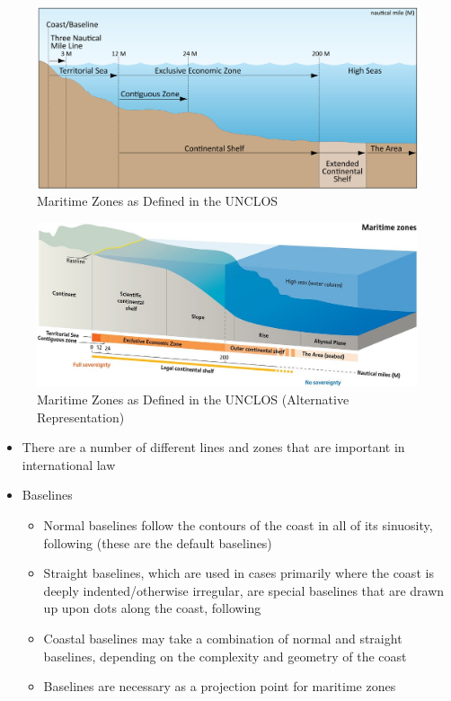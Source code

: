 \begin{figure}[H]
    \centering
    \includegraphics[width=1\textwidth]{Images/Maritime Zones.png}
    \caption{Maritime Zones as Defined in the UNCLOS}
    \label{fig:Maritime Zones}
\end{figure}

\begin{figure}[H]
    \centering
    \includegraphics[width=1\textwidth]{Images/UNCLOS Maritime Zones.jpeg}
    \caption{Maritime Zones as Defined in the UNCLOS (Alternative Representation)}
    \label{fig:UNCLOS Maritime Zones}
\end{figure}

\begin{itemize}
    \item There are a number of different lines and zones that are important in international law
    \item Baselines
    \begin{itemize}
        \item Normal baselines follow the contours of the coast in all of its sinuosity, following  (these are the default baselines)
        \item Straight baselines, which are used in cases primarily where the coast is deeply indented/otherwise irregular, are special baselines that are drawn up upon dots along the coast, following 
        \item Coastal baselines may take a combination of normal and straight baselines, depending on the complexity and geometry of the coast
        \item Baselines are necessary as a projection point for maritime zones
    \end{itemize}
\end{itemize}


